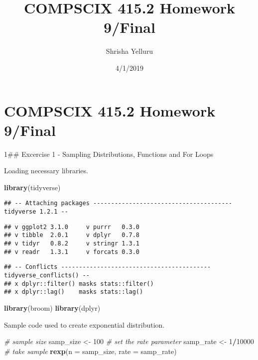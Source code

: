 \documentclass[]{article}
\title{COMPSCIX 415.2 Homework 9/Final}
\author{Shrisha Yelluru}
\date{4/1/2019}
\newenvironment{Shaded}{\begin{snugshade}}{\end{snugshade}}
\newcommand{\KeywordTok}[1]{\textcolor[rgb]{0.13,0.29,0.53}{\textbf{#1}}}
\newcommand{\DataTypeTok}[1]{\textcolor[rgb]{0.13,0.29,0.53}{#1}}
\newcommand{\DecValTok}[1]{\textcolor[rgb]{0.00,0.00,0.81}{#1}}
\newcommand{\StringTok}[1]{\textcolor[rgb]{0.31,0.60,0.02}{#1}}
\newcommand{\CommentTok}[1]{\textcolor[rgb]{0.56,0.35,0.01}{\textit{#1}}}
\newcommand{\OperatorTok}[1]{\textcolor[rgb]{0.81,0.36,0.00}{\textbf{#1}}}
\newcommand{\NormalTok}[1]{#1}
\begin{document}
\maketitle

\section{COMPSCIX 415.2 Homework
9/Final}\label{compscix-415.2-homework-9final}

1\#\# Excercise 1 - Sampling Distributions, Functions and For Loops

Loading necessary libraries.

\begin{Shaded}
\begin{Highlighting}[]
\KeywordTok{library}\NormalTok{(tidyverse)}
\end{Highlighting}
\end{Shaded}

\begin{verbatim}
## -- Attaching packages --------------------------------------- tidyverse 1.2.1 --
\end{verbatim}

\begin{verbatim}
## v ggplot2 3.1.0     v purrr   0.3.0
## v tibble  2.0.1     v dplyr   0.7.8
## v tidyr   0.8.2     v stringr 1.3.1
## v readr   1.3.1     v forcats 0.3.0
\end{verbatim}

\begin{verbatim}
## -- Conflicts ------------------------------------------ tidyverse_conflicts() --
## x dplyr::filter() masks stats::filter()
## x dplyr::lag()    masks stats::lag()
\end{verbatim}

\begin{Shaded}
\begin{Highlighting}[]
\KeywordTok{library}\NormalTok{(broom)}
\KeywordTok{library}\NormalTok{(dplyr)}
\end{Highlighting}
\end{Shaded}

Sample code used to create exponential distribution.

\begin{Shaded}
\begin{Highlighting}[]
\CommentTok{# sample size}
\NormalTok{samp_size <-}\StringTok{ }\DecValTok{100}
\CommentTok{# set the rate parameter}
\NormalTok{samp_rate <-}\StringTok{ }\DecValTok{1}\OperatorTok{/}\DecValTok{10000}
\CommentTok{# take sample}
\KeywordTok{rexp}\NormalTok{(}\DataTypeTok{n =}\NormalTok{ samp_size, }\DataTypeTok{rate =}\NormalTok{ samp_rate)}
\end{Highlighting}
\end{Shaded}
\end{document}
